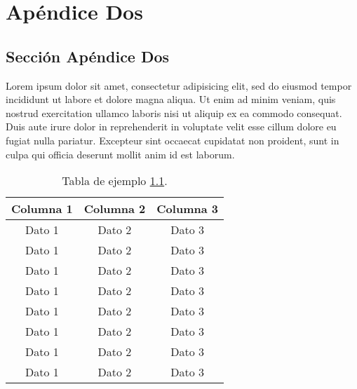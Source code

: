 
\chapter{Apéndice Dos}

\section{Sección Apéndice Dos}\label{apnx:dos}

Lorem ipsum dolor sit amet, consectetur adipisicing elit, sed do eiusmod tempor incididunt ut labore et dolore magna aliqua. Ut enim ad minim veniam, quis nostrud exercitation ullamco laboris nisi ut aliquip ex ea commodo consequat. Duis aute irure dolor in reprehenderit in voluptate velit esse cillum dolore eu fugiat nulla pariatur. Excepteur sint occaecat cupidatat non proident, sunt in culpa qui officia deserunt mollit anim id est laborum.

\begin{table}[!ht]
  \caption{Tabla de ejemplo \ref{tab:ejemplo3}.}
  \centering
  \begin{tabular}{ccc}
    \toprule
    \textbf{Columna 1} & \textbf{Columna 2} & \textbf{Columna 3}\\
    \midrule
    Dato 1             & Dato 2             & Dato 3            \\
    Dato 1             & Dato 2             & Dato 3            \\
    Dato 1             & Dato 2             & Dato 3            \\
    Dato 1             & Dato 2             & Dato 3            \\
    Dato 1             & Dato 2             & Dato 3            \\
    Dato 1             & Dato 2             & Dato 3            \\
    Dato 1             & Dato 2             & Dato 3            \\
    Dato 1             & Dato 2             & Dato 3            \\
    \bottomrule
  \end{tabular}
  \label{tab:ejemplo3}

\end{table}
